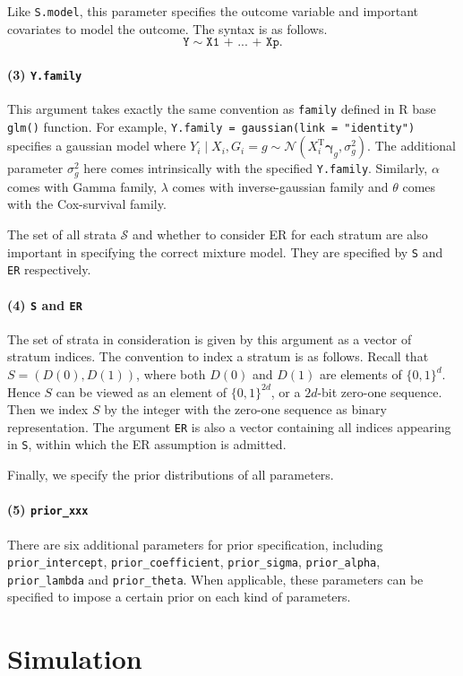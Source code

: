 \documentclass{article}
\begin{document}
Like \texttt{S.model}, this parameter specifies the outcome variable and important covariates to model the outcome. The syntax is as follows. $$\texttt{Y} \sim \texttt{X1 + ... + Xp}.$$

\paragraph{(3) \texttt{Y.family}}

This argument takes exactly the same convention as \texttt{family} defined in \textsf{R} base \texttt{glm()} function. For example, \texttt{Y.family = gaussian(link = "identity")} specifies a gaussian model where $Y_i\mid X_i, G_i = g \sim \mathcal{N}(X_i^\mathrm{T}\boldsymbol{\gamma}_g, \sigma_g^2)$. The additional parameter $\sigma_g^2$ here comes intrinsically with the specified \texttt{Y.family}. Similarly, $\alpha$ comes with Gamma family, $\lambda$ comes with inverse-gaussian family and $\theta$ comes with the Cox-survival family.

The set of all strata $\mathcal{S}$ and whether to consider ER for each stratum are also important in specifying the correct mixture model. They are specified by \texttt{S} and \texttt{ER} respectively.

\paragraph{(4) \texttt{S} and \texttt{ER}} The set of strata in consideration is given by this argument as a vector of stratum indices. The convention to index a stratum is as follows. Recall that $S = (D(0), D(1))$, where both $D(0)$ and $D(1)$ are elements of $\{0, 1\}^d$. Hence $S$ can be viewed as an element of $\{0, 1\}^{2d}$, or a $2d$-bit zero-one sequence. Then we index $S$ by the integer with the zero-one sequence as binary representation. The argument \texttt{ER} is also a vector containing all indices appearing in \texttt{S}, within which the ER assumption is admitted.

Finally, we specify the prior distributions of all parameters.

\paragraph{(5) \texttt{prior\_xxx}} There are six additional parameters for prior specification, including \texttt{prior\_intercept}, \texttt{prior\_coefficient}, \texttt{prior\_sigma}, \texttt{prior\_alpha}, \texttt{prior\_lambda} and \texttt{prior\_theta}. When applicable, these parameters can be specified to impose a certain prior on each kind of parameters.

\section{Simulation}
\end{document}
